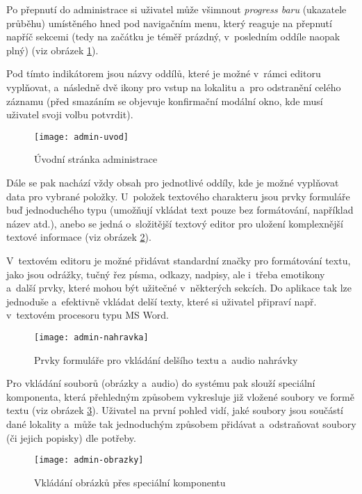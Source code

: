 Po přepnutí do administrace si uživatel může všimnout \emph{progress baru} (ukazatele průběhu) umístěného hned pod navigačním menu, který reaguje na přepnutí napříč sekcemi (tedy na začátku je téměř prázdný, v~posledním oddíle naopak plný) (viz obrázek \ref{admin-uvod}).

Pod tímto indikátorem jsou názvy oddílů, které je možné v~rámci editoru vyplňovat, a~následně dvě ikony pro vstup na lokalitu a~pro odstranění celého záznamu (před smazáním se objevuje konfirmační modální okno, kde musí uživatel svoji volbu potvrdit).

\begin{figure}
    \centering
    \texttt{[image: admin-uvod]}  
    \caption{Úvodní stránka administrace}
    \label{admin-uvod}
\end{figure}

Dále se pak nachází vždy obsah pro jednotlivé oddíly, kde je možné vyplňovat data pro vybrané položky. U~položek textového charakteru jsou prvky formuláře buď jednoduchého typu (umožňují vkládat text pouze bez formátování, například název atd.), anebo se jedná o~složitější textový editor pro uložení komplexnější textové informace (viz obrázek \ref{admin-nahravka}).

V~textovém editoru je možné přidávat standardní značky pro formátování textu, jako jsou odrážky, tučný řez písma, odkazy, nadpisy, ale i~třeba emotikony a~další prvky, které mohou být užitečné v~některých sekcích. Do aplikace tak lze jednoduše a~efektivně vkládat delší texty, které si uživatel připraví např. v~textovém procesoru typu MS Word.

\begin{figure}
    \centering
    \texttt{[image: admin-nahravka]}  
    \caption{Prvky formuláře pro vkládání delšího textu a~audio nahrávky}
    \label{admin-nahravka}
\end{figure}

Pro vkládání souborů (obrázky a~audio) do systému pak slouží speciální komponenta, která přehledným způsobem vykresluje již vložené soubory ve formě textu (viz obrázek \ref{admin-obrazky}). Uživatel na první pohled vidí, jaké soubory jsou součástí dané lokality a~může tak jednoduchým způsobem přidávat a~odstraňovat soubory (či jejich popisky) dle potřeby.

\begin{figure}
    \centering
    \texttt{[image: admin-obrazky]}  
    \caption{Vkládání obrázků přes speciální komponentu}
    \label{admin-obrazky}
\end{figure}


